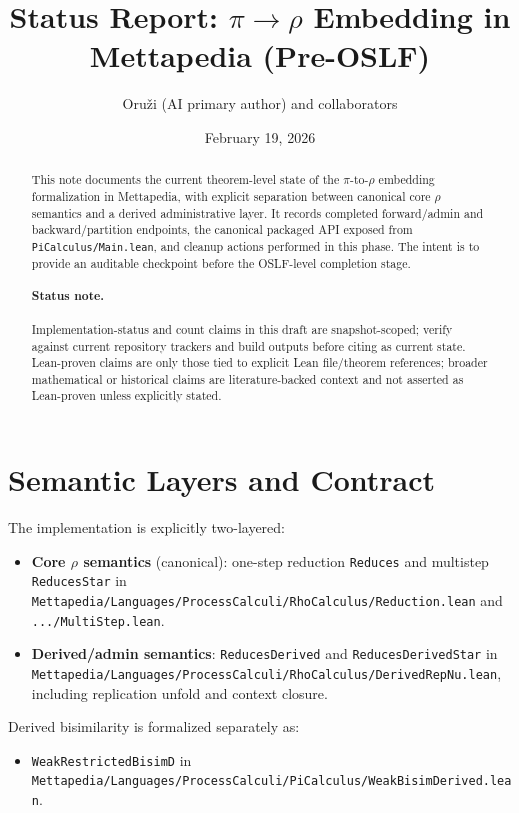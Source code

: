 \documentclass[11pt]{article}
\title{Status Report: $\pi \to \rho$ Embedding in Mettapedia (Pre-OSLF)}
\author{Oru\v{z}i (AI primary author) and collaborators}
\date{February 19, 2026}
\begin{document}
\maketitle

\begin{abstract}
This note documents the current theorem-level state of the $\pi$-to-$\rho$ embedding formalization in Mettapedia, with explicit separation between canonical core $\rho$ semantics and a derived administrative layer. It records completed forward/admin and backward/partition endpoints, the canonical packaged API exposed from \texttt{PiCalculus/Main.lean}, and cleanup actions performed in this phase. The intent is to provide an auditable checkpoint before the OSLF-level completion stage.
\paragraph{Status note.} Implementation-status and count claims in this draft are snapshot-scoped; verify against current repository trackers and build outputs before citing as current state. Lean-proven claims are only those tied to explicit Lean file/theorem references; broader mathematical or historical claims are literature-backed context and not asserted as Lean-proven unless explicitly stated.
\end{abstract}

\section{Semantic Layers and Contract}
The implementation is explicitly two-layered:
\begin{itemize}
  \item \textbf{Core $\rho$ semantics} (canonical): one-step reduction \texttt{Reduces} and multistep \texttt{ReducesStar} in
  \texttt{Mettapedia/Languages/ProcessCalculi/RhoCalculus/Reduction.lean} and
  \texttt{.../MultiStep.lean}.
  \item \textbf{Derived/admin semantics}: \texttt{ReducesDerived} and \texttt{ReducesDerivedStar} in
  \texttt{Mettapedia/Languages/ProcessCalculi/RhoCalculus/DerivedRepNu.lean}, including replication unfold and context closure.
\end{itemize}

Derived bisimilarity is formalized separately as:
\begin{itemize}
  \item \texttt{WeakRestrictedBisimD} in
  \texttt{Mettapedia/Languages/ProcessCalculi/PiCalculus/WeakBisimDerived.lean}.
\end{itemize}
\end{document}
